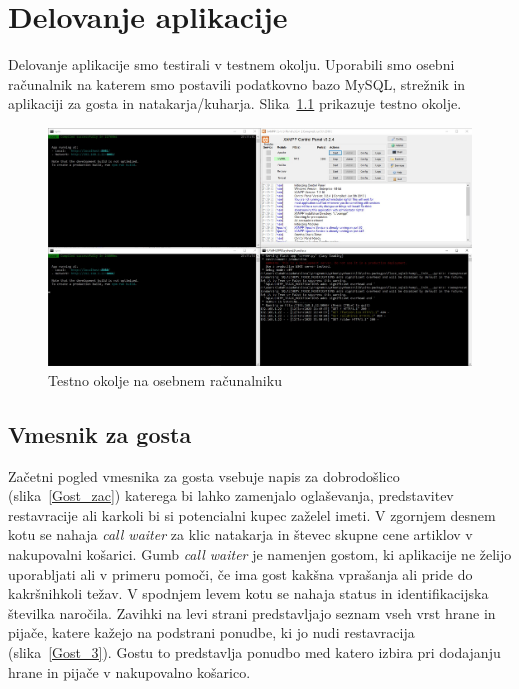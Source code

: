 \documentclass[a4paper, 12pt]{book}
\begin{document}
\chapter {Delovanje aplikacije}
Delovanje aplikacije smo testirali v testnem okolju. Uporabili smo osebni računalnik na katerem smo postavili podatkovno bazo MySQL, strežnik in aplikaciji za gosta in natakarja/kuharja. Slika~\ref{Program1} prikazuje testno okolje.

\begin{figure}[!htb]
\begin{center}
\includegraphics[width=14cm]{Programi.jpg}
\caption{Testno okolje na osebnem računalniku}
\label{Program1}
\end{center}
\end{figure}


\section{Vmesnik za gosta}
Začetni pogled vmesnika za gosta vsebuje napis za dobrodošlico (slika~\ref{Gost_zac}) katerega bi lahko zamenjalo oglaševanja, predstavitev restavracije ali karkoli bi si potencialni kupec zaželel imeti. V zgornjem desnem kotu se nahaja 
 \textit{call waiter} za klic natakarja in števec skupne cene artiklov v nakupovalni košarici. Gumb \textit{call waiter} je namenjen gostom, ki aplikacije ne želijo uporabljati ali v primeru pomoči, če ima gost kakšna vprašanja ali pride do kakršnihkoli težav. V spodnjem levem kotu se nahaja status in identifikacijska številka naročila. 
Zavihki na levi strani predstavljajo seznam vseh vrst hrane in pijače, katere kažejo na podstrani ponudbe, ki jo nudi restavracija (slika~\ref{Gost_3}). Gostu to predstavlja ponudbo med katero izbira pri dodajanju hrane in pijače v nakupovalno košarico.
\end{document}
